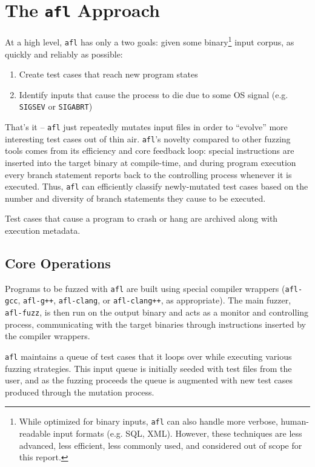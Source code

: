 \chapter{The \texttt{afl} Approach}

At a high level, \texttt{afl} has only a two goals: given some binary\footnote{While optimized for binary inputs, \texttt{afl} can also handle more verbose, human-readable input formats (e.g. SQL, XML). However, these techniques are less advanced, less efficient, less commonly used, and considered out of scope for this report.}
input corpus, as quickly and reliably as possible:

\begin{enumerate}
    \item Create test cases that reach new program states
    \item Identify inputs that cause the process to die due to some
    OS signal (e.g. \texttt{SIGSEV} or \texttt{SIGABRT})
\end{enumerate}

That's it -- \texttt{afl} just repeatedly mutates input files in order to
``evolve'' more interesting test cases out of thin air.
\texttt{afl}'s novelty compared to other fuzzing tools comes from its
efficiency and core feedback loop: special instructions are inserted into the
target binary at compile-time, and during program execution every branch
statement reports back to the controlling process whenever it is executed.
Thus, \texttt{afl} can efficiently classify newly-mutated test cases based on
the number and diversity of branch statements they cause to be executed.

Test cases that cause a program to crash or hang are archived along with
execution metadata.

\section{Core Operations}

Programs to be fuzzed with \texttt{afl} are built using special compiler
wrappers (\texttt{afl-gcc}, \texttt{afl-g++}, \texttt{afl-clang}, or
\texttt{afl-clang++}, as appropriate). The main fuzzer, \texttt{afl-fuzz},
is then run on the output binary and acts as a monitor and controlling
process, communicating with the target binaries through instructions
inserted by the compiler wrappers.

\texttt{afl} maintains a queue of test cases that it loops over while
executing various fuzzing strategies. This input queue is initially seeded
with test files from the user, and as the fuzzing proceeds the queue is
augmented with new test cases produced through the mutation process.


